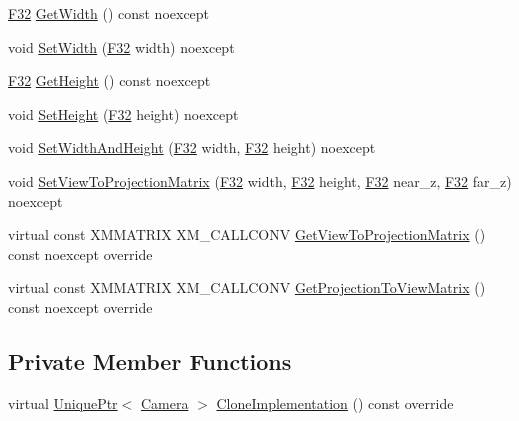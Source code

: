 \begin{DoxyCompactItemize}
\item 
\hyperlink{namespacemage_aa97e833b45f06d60a0a9c4fc22ae02c0}{F32} \hyperlink{classmage_1_1_orthographic_camera_adbafcc6cf5175f10e75599b0bbe95740}{Get\+Width} () const noexcept
\item 
void \hyperlink{classmage_1_1_orthographic_camera_a43af64f189a3159f50809ca499624ed6}{Set\+Width} (\hyperlink{namespacemage_aa97e833b45f06d60a0a9c4fc22ae02c0}{F32} width) noexcept
\item 
\hyperlink{namespacemage_aa97e833b45f06d60a0a9c4fc22ae02c0}{F32} \hyperlink{classmage_1_1_orthographic_camera_a3845253608fb385ca6e48c619c5b39c1}{Get\+Height} () const noexcept
\item 
void \hyperlink{classmage_1_1_orthographic_camera_a29e910ff54a53ee149798cbf062e9416}{Set\+Height} (\hyperlink{namespacemage_aa97e833b45f06d60a0a9c4fc22ae02c0}{F32} height) noexcept
\item 
void \hyperlink{classmage_1_1_orthographic_camera_a1a2c9e7e74b7ab25070ffd6ec43faa4d}{Set\+Width\+And\+Height} (\hyperlink{namespacemage_aa97e833b45f06d60a0a9c4fc22ae02c0}{F32} width, \hyperlink{namespacemage_aa97e833b45f06d60a0a9c4fc22ae02c0}{F32} height) noexcept
\item 
void \hyperlink{classmage_1_1_orthographic_camera_a8b86c23bb9da55d9e55a4da4a82b9d72}{Set\+View\+To\+Projection\+Matrix} (\hyperlink{namespacemage_aa97e833b45f06d60a0a9c4fc22ae02c0}{F32} width, \hyperlink{namespacemage_aa97e833b45f06d60a0a9c4fc22ae02c0}{F32} height, \hyperlink{namespacemage_aa97e833b45f06d60a0a9c4fc22ae02c0}{F32} near\+\_\+z, \hyperlink{namespacemage_aa97e833b45f06d60a0a9c4fc22ae02c0}{F32} far\+\_\+z) noexcept
\item 
virtual const X\+M\+M\+A\+T\+R\+IX X\+M\+\_\+\+C\+A\+L\+L\+C\+O\+NV \hyperlink{classmage_1_1_orthographic_camera_a9ba51750d26d91fa094d82f875c7f1e5}{Get\+View\+To\+Projection\+Matrix} () const noexcept override
\item 
virtual const X\+M\+M\+A\+T\+R\+IX X\+M\+\_\+\+C\+A\+L\+L\+C\+O\+NV \hyperlink{classmage_1_1_orthographic_camera_a7bbc235a85877c12b60d1a56d5b65108}{Get\+Projection\+To\+View\+Matrix} () const noexcept override
\end{DoxyCompactItemize}
\subsection*{Private Member Functions}
\begin{DoxyCompactItemize}
\item 
virtual \hyperlink{namespacemage_a3316d7143a973e37adf1110f2e80ca31}{Unique\+Ptr}$<$ \hyperlink{classmage_1_1_camera}{Camera} $>$ \hyperlink{classmage_1_1_orthographic_camera_aeef89cff8f4272b1412fa3ce366e656d}{Clone\+Implementation} () const override
\end{DoxyCompactItemize}
